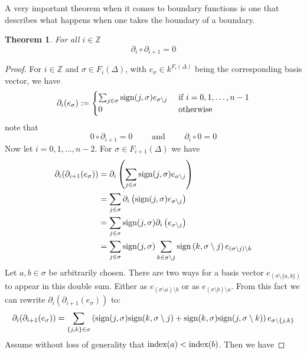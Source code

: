 \documentclass[11pt,a4paper,twoside]{report}
\newtheorem{mythm}{Theorem}[chapter]
\begin{document}
A very important theorem when it comes to boundary functions is one that describes what happens when one takes the boundary of a boundary.
\begin{mythm}\label{thm:boundary}
For all $i\in\mathbb{Z}$ 
\begin{equation*}
\partial_i\circ\partial_{i+1}=0
\end{equation*}
\end{mythm}
\begin{proof}
For $i\in\mathbb{Z}$ and $\sigma\in F_i(\Delta)$, with $e_\sigma\in k^{F_i(\Delta)}$ being the corresponding basis vector, we have 
\begin{equation*}
\partial_i(e_\sigma):=
\begin{cases}
\sum_{j\in\sigma}\textnormal{sign}(j,\sigma)e_{\sigma\setminus j} & \textnormal{ if } i=0,1,\dots,n-1 \\
0 & \textnormal{ otherwise}
\end{cases}
\end{equation*}
note that 
\begin{equation*}
0\circ\partial_{i+1}=0 \qquad \text{ and } \qquad \partial_i\circ 0 = 0
\end{equation*}
Now let $i=0,1,\dots,n-2$. For $\sigma\in F_{i+1}(\Delta)$ we have
\begin{align*}
\partial_i(\partial_{i+1}(e_\sigma))&=\partial_i\left(\sum_{j\in\sigma}\textnormal{sign}(j,\sigma)e_{\sigma\setminus j}\right) \\
&=\sum_{j\in\sigma}\partial_i\left(\textnormal{sign}(j,\sigma)e_{\sigma\setminus j}\right)\\
&=\sum_{j\in\sigma}\textnormal{sign}(j,\sigma)\partial_i\left(e_{\sigma\setminus j}\right)\\
&=\sum_{j\in\sigma}\textnormal{sign}(j,\sigma)\sum_{k\in\sigma\setminus j}\textnormal{sign}\left(k,\sigma\setminus j\right)e_{(\sigma\setminus j)\setminus k}\\
\end{align*}
Let $a,b\in\sigma$ be arbitrarily chosen. There are two ways for a basis vector $e_{\left(\sigma\setminus\{a,b\}\right)}$ to appear in this double sum. Either as $e_{(\sigma\setminus a)\setminus b}$ or as $e_{(\sigma\setminus b)\setminus a}$. From this fact we can rewrite $\partial_i(\partial_{i+1}(e_\sigma))$ to:
\begin{equation}
\partial_i(\partial_{i+1}(e_\sigma))=\sum_{\{j,k\}\in\sigma}\left(\textnormal{sign}(j,\sigma)\textnormal{sign}(k,\sigma\setminus j) + \textnormal{sign}(k,\sigma)\textnormal{sign}(j,\sigma\setminus k)\right)e_{\sigma\setminus\{j,k\}} \label{eq_boundary: 0}
\end{equation}
Assume without loss of generality that $\textnormal{index}(a)<\textnormal{index}(b)$. Then we have 


\end{proof}
\end{document}
